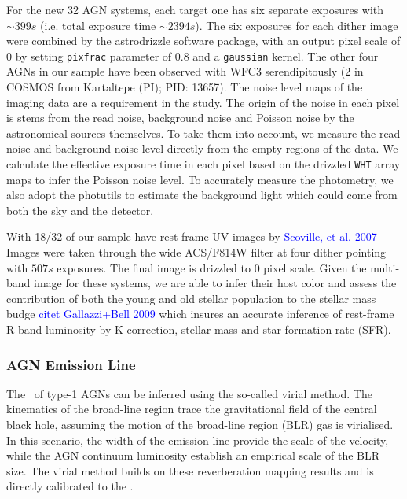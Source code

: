 \documentclass[apj]{emulateapj}
\begin{document}
For the new 32 AGN systems, each target one has six separate exposures with $\sim399s$ (i.e. total exposure time $\sim2394s$). The six exposures for each dither image were combined by the {\sc astrodrizzle} software package, with an output pixel scale of 0 by setting \texttt{pixfrac} parameter of 0.8 and a \texttt{gaussian} kernel. The other four AGNs in our sample have been observed with WFC3 serendipitously (2 in COSMOS from Kartaltepe (PI); PID: 13657).
The noise level maps of the imaging data are a requirement in the study. The origin of the noise in each pixel is stems from the read noise, background noise and Poisson noise by the astronomical sources themselves. To take them into account, we measure the read noise and background noise level directly from the empty regions of the data. We calculate the effective exposure time in each pixel based on the drizzled \texttt{WHT} array maps to infer the Poisson noise level. To accurately measure the photometry, we also adopt the {\sc photutils} to estimate the background light which could come from both the sky and the detector.


With 18/32 of our sample have rest-frame UV images by \textcolor{blue}{Scoville, et al. 2007} %
Images were taken through the wide ACS/F814W filter at four dither pointing with $507s$ exposures. The final image is drizzled to 0 pixel scale. Given the multi-band image for these systems, we are able to infer their host color and assess the contribution of both the young and old stellar population to the stellar mass budge \textcolor{blue}{citet Gallazzi+Bell 2009} which insures an accurate inference of rest-frame R-band luminosity by K-correction, stellar mass and star formation rate (SFR). 

\subsubsection{AGN Emission Line}
\label{sec:bh_mass}
The \mbh\ of type-1 AGNs can be inferred using the so-called virial method. The kinematics of the broad-line region trace the gravitational field of the central black hole, assuming the motion of the broad-line region (BLR) gas is virialised. In this scenario, the width of the emission-line provide the scale of the velocity, while the AGN continuum luminosity establish an empirical scale of the BLR size. The virial method builds on these reverberation mapping results and is directly calibrated to the \mbh.
\end{document}
